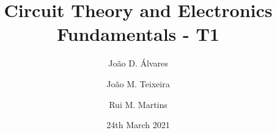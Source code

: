 \title{\textbf{Circuit Theory and Electronics Fundamentals - T1}}
\author[1]{João D. Álvares}
\author[1]{João M. Teixeira}
\author[1]{Rui M. Martins}


\date{24th March 2021}